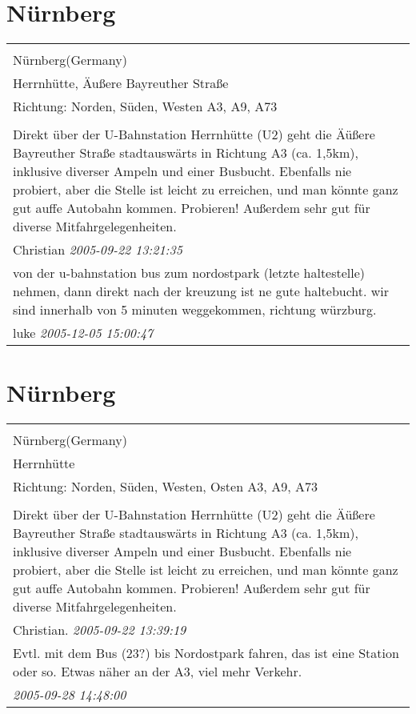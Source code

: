 \documentclass[a4paper,12pt]{article}
\begin{document}
\section{Nürnberg}
\begin{tabular}{|p{13cm}|}
\hline\\
Nürnberg(Germany)\\
Herrnhütte, Äußere Bayreuther Straße\\
Richtung: Norden, Süden, Westen A3, A9, A73 \\
\hline\\
Direkt über der U-Bahnstation Herrnhütte (U2) geht die Äüßere Bayreuther Straße stadtauswärts in Richtung A3 (ca. 1,5km), inklusive diverser Ampeln und einer Busbucht. Ebenfalls nie probiert, aber die Stelle ist leicht zu erreichen, und man könnte ganz gut auffe Autobahn kommen. Probieren! Außerdem sehr gut für diverse Mitfahrgelegenheiten. \\
Christian \textit{ 2005-09-22 13:21:35 }\\\hline von der u-bahnstation bus zum nordostpark (letzte haltestelle) nehmen, dann direkt nach der kreuzung ist ne gute haltebucht.
wir sind innerhalb von 5 minuten weggekommen, richtung würzburg. \\
luke \textit{ 2005-12-05 15:00:47 }\\\hline
\end{tabular}


\section{Nürnberg}
\begin{tabular}{|p{13cm}|}
\hline\\
Nürnberg(Germany)\\
Herrnhütte\\
Richtung: Norden, Süden, Westen, Osten A3, A9, A73 \\
\hline\\
Direkt über der U-Bahnstation Herrnhütte (U2) geht die Äüßere Bayreuther Straße stadtauswärts in Richtung A3 (ca. 1,5km), inklusive diverser Ampeln und einer Busbucht. Ebenfalls nie probiert, aber die Stelle ist leicht zu erreichen, und man könnte ganz gut auffe Autobahn kommen. Probieren! Außerdem sehr gut für diverse Mitfahrgelegenheiten. \\
Christian. \textit{ 2005-09-22 13:39:19 }\\\hline Evtl. mit dem Bus (23?) bis Nordostpark fahren, das ist eine Station oder so. Etwas näher an der A3, viel mehr Verkehr. \\
\textit{ 2005-09-28 14:48:00 }\\\hline
\end{tabular}
\end{document}
